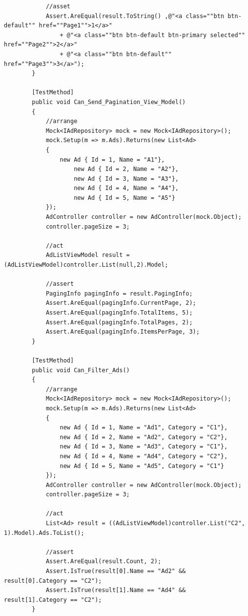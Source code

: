 \documentclass[14pt,a4paper]{extreport}
\begin{document}
\begin{lstlisting}
            //asset
            Assert.AreEqual(result.ToString() ,@"<a class=""btn btn-default"" href=""Page1"">1</a>"
                + @"<a class=""btn btn-default btn-primary selected"" href=""Page2"">2</a>"
                + @"<a class=""btn btn-default"" href=""Page3"">3</a>");
        }

        [TestMethod]
        public void Can_Send_Pagination_View_Model()
        {
            //arrange
            Mock<IAdRepository> mock = new Mock<IAdRepository>();
            mock.Setup(m => m.Ads).Returns(new List<Ad>
            {
                new Ad { Id = 1, Name = "A1"},
                    new Ad { Id = 2, Name = "A2"},
                    new Ad { Id = 3, Name = "A3"},
                    new Ad { Id = 4, Name = "A4"},
                    new Ad { Id = 5, Name = "A5"}
            });
            AdController controller = new AdController(mock.Object);
            controller.pageSize = 3;

            //act
            AdListViewModel result = (AdListViewModel)controller.List(null,2).Model;

            //assert
            PagingInfo pagingInfo = result.PagingInfo;
            Assert.AreEqual(pagingInfo.CurrentPage, 2);
            Assert.AreEqual(pagingInfo.TotalItems, 5);
            Assert.AreEqual(pagingInfo.TotalPages, 2);
            Assert.AreEqual(pagingInfo.ItemsPerPage, 3);
        }

        [TestMethod]
        public void Can_Filter_Ads()
        {
            //arrange
            Mock<IAdRepository> mock = new Mock<IAdRepository>();
            mock.Setup(m => m.Ads).Returns(new List<Ad>
            {
                new Ad { Id = 1, Name = "Ad1", Category = "C1"},
                new Ad { Id = 2, Name = "Ad2", Category = "C2"},
                new Ad { Id = 3, Name = "Ad3", Category = "C1"},
                new Ad { Id = 4, Name = "Ad4", Category = "C2"},
                new Ad { Id = 5, Name = "Ad5", Category = "C1"}
            });
            AdController controller = new AdController(mock.Object);
            controller.pageSize = 3;

            //act
            List<Ad> result = ((AdListViewModel)controller.List("C2", 1).Model).Ads.ToList();

            //assert
            Assert.AreEqual(result.Count, 2);
            Assert.IsTrue(result[0].Name == "Ad2" && result[0].Category == "C2");
            Assert.IsTrue(result[1].Name == "Ad4" && result[1].Category == "C2");
        }


\end{lstlisting}
\end{document}
